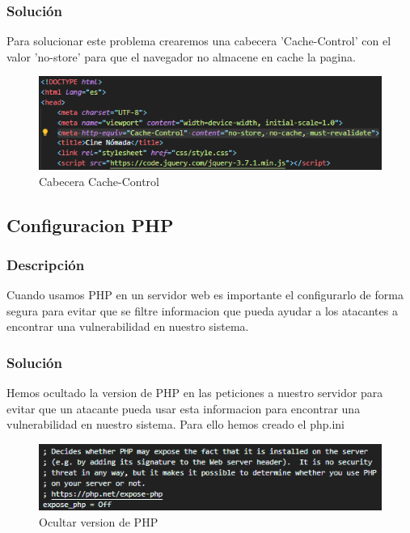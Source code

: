\documentclass{report}
\begin{document}
                \subsubsection{Solución}
                    Para solucionar este problema crearemos una cabecera 'Cache-Control' con el valor 'no-store' para que el navegador no almacene en cache la pagina.
                    \begin{figure}[H]
                        \centering
                        \includegraphics[width=\textwidth]{./img/vulnerabilidades/3.5.9.1.png}
                        \caption{Cabecera Cache-Control}
                    \end{figure}
            \clearpage
            \subsection{Configuracion PHP}
                \subsubsection{Descripción}
                    Cuando usamos PHP en un servidor web es importante el configurarlo de forma segura para evitar que se filtre informacion que pueda ayudar a los atacantes a encontrar una vulnerabilidad en nuestro sistema.
                \subsubsection{Solución}
                    Hemos ocultado la version de PHP en las peticiones a nuestro servidor para evitar que un atacante pueda usar esta informacion para encontrar una vulnerabilidad en nuestro sistema. Para ello hemos creado el php.ini
                    \begin{figure}[H]
                        \centering
                        \includegraphics[width=\textwidth]{./img/vulnerabilidades/3.5.10.1.png}
                        \caption{Ocultar version de PHP}
                    \end{figure}
            \clearpage
\end{document}
